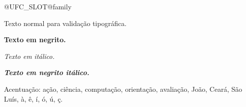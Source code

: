 \documentclass{ufctex}
\begin{document}
\csname @UFC_SLOT@family\endcsname

Texto normal para validação tipográfica.

\textbf{Texto em negrito.}

\textit{Texto em itálico.}

\textbf{\textit{Texto em negrito itálico.}}

Acentuação: ação, ciência, computação, orientação, avaliação, João, Ceará, São Luís, à, ê, í, ó, ú, ç.
\end{document}
